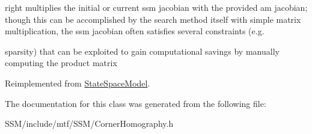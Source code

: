 right multiplies the initial or current ssm jacobian with the provided am jacobian; though this can be accomplished by the search method itself with simple matrix multiplication, the ssm jacobian often satisfies several constraints (e.\-g. 

sparsity) that can be exploited to gain computational savings by manually computing the product matrix 

Reimplemented from \hyperlink{classStateSpaceModel_ac956c679581e746891c62755fe715b3b}{State\-Space\-Model}.



The documentation for this class was generated from the following file\-:\begin{DoxyCompactItemize}
\item 
S\-S\-M/include/mtf/\-S\-S\-M/Corner\-Homography.\-h\end{DoxyCompactItemize}
